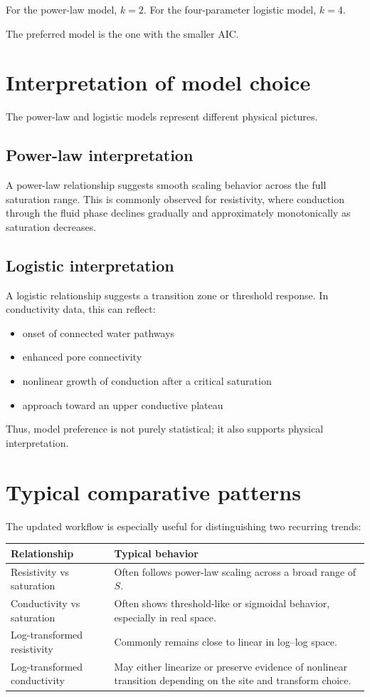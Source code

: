 \documentclass[11pt]{article}
\begin{document}
For the power-law model, $k=2$.  
For the four-parameter logistic model, $k=4$.

The preferred model is the one with the smaller AIC.

\section{Interpretation of model choice}

The power-law and logistic models represent different physical pictures.

\subsection{Power-law interpretation}

A power-law relationship suggests smooth scaling behavior across the full saturation range. This is commonly observed for resistivity, where conduction through the fluid phase declines gradually and approximately monotonically as saturation decreases.

\subsection{Logistic interpretation}

A logistic relationship suggests a transition zone or threshold response. In conductivity data, this can reflect:
\begin{itemize}[leftmargin=1.5em]
\item onset of connected water pathways
\item enhanced pore connectivity
\item nonlinear growth of conduction after a critical saturation
\item approach toward an upper conductive plateau
\end{itemize}

Thus, model preference is not purely statistical; it also supports physical interpretation.

\section{Typical comparative patterns}

The updated workflow is especially useful for distinguishing two recurring trends:

\begin{longtable}{p{} p{}}
\toprule
\textbf{Relationship} & \textbf{Typical behavior}\\
\midrule
\endhead
Resistivity vs saturation & Often follows power-law scaling across a broad range of $S$.\\
Conductivity vs saturation & Often shows threshold-like or sigmoidal behavior, especially in real space.\\
Log-transformed resistivity & Commonly remains close to linear in log--log space.\\
Log-transformed conductivity & May either linearize or preserve evidence of nonlinear transition depending on the site and transform choice.\\
\bottomrule
\end{longtable}
\end{document}
